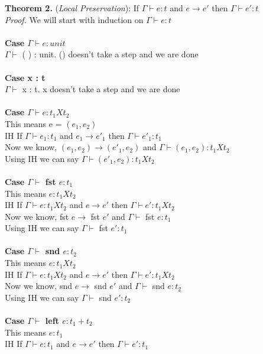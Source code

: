 \documentclass{article}
\begin{document}
\textbf{Theorem 2.} (\textit{Local Preservation}): If $\Gamma \vdash e : t$ and  $e \to e'$ then $\Gamma \vdash e' : t$
  \\
\textit{Proof.} We will start with induction on $\Gamma \vdash e : t$ \\\\
\textbf{Case $\Gamma \vdash e : unit$} \\
 $\Gamma \vdash $ ( ) : unit. () doesn't take a step and we are done \\ \\
\textbf{Case x : t}      \\ 
$\Gamma \vdash $ x : t. x doesn't take a step and we are done \\ \\
\textbf{Case $\Gamma \vdash e : t_1 X t_2$ } \\
This means e = $(e_1, e_2)$ \\
IH If $\Gamma \vdash e_1 : t_1$ and  $e_1 \to e'_1$ then $\Gamma \vdash e'_1 : t_1$ \\
Now we know, $(e_1,e_2) \to (e'_1, e_2)$ and $\Gamma \vdash (e_1, e_2) : t_1 X t_2$ \\
Using IH we can say $\Gamma \vdash (e'_1, e_2) : t_1 X t_2$ \\\\
\textbf{Case $\Gamma \vdash$ fst $e : t_1$ } \\
This means $e : t_1Xt_2$ \\
IH If $\Gamma \vdash e : t_1Xt_2$ and  $e \to e'$ then $\Gamma \vdash e' : t_1Xt_2$ \\
Now we know, fst $e \to$ fst $e'$ and $\Gamma \vdash$ fst $e : t_1$ \\
Using IH we can say $\Gamma \vdash$ fst $ e' : t_1$ \\\\
\textbf{Case $\Gamma \vdash$ snd $e : t_2$ } \\
This means $e : t_1Xt_2$ \\
IH If $\Gamma \vdash e : t_1Xt_2$ and  $e \to e'$ then $\Gamma \vdash e' : t_1Xt_2$ \\
Now we know, snd $e \to$ snd $e'$ and $\Gamma \vdash$ snd $e : t_2$ \\
Using IH we can say $\Gamma \vdash$ snd $ e' : t_2$ \\\\
\textbf{Case $\Gamma \vdash$ left $e : t_1+t_2$ } \\
This means $e : t_1$ \\
IH If $\Gamma \vdash e : t_1$ and  $e \to e'$ then $\Gamma \vdash e' : t_1$ \\
\end{document}
